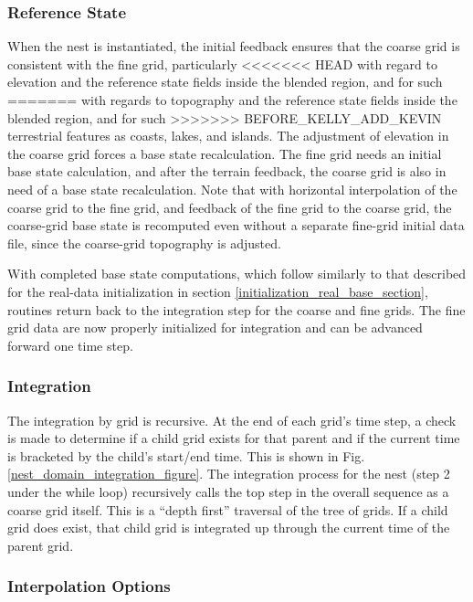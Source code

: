\subsubsection{Reference State}
When the nest is instantiated, the initial feedback ensures
that the coarse grid is consistent with the fine grid, particularly 
<<<<<<< HEAD
with regard to elevation and the reference state fields inside the blended region, and for such 
=======
with regards to topography and the reference state fields inside the blended region, and for such 
>>>>>>> BEFORE_KELLY_ADD_KEVIN
terrestrial features as coasts, lakes, and islands.  The adjustment 
of elevation in the coarse grid forces a base state recalculation.  
The fine grid needs an initial base state calculation, and after
the terrain feedback, the coarse grid is also in need of a base state
recalculation.  Note that with horizontal interpolation of the coarse grid 
to the fine grid, and feedback of the fine grid to the coarse 
grid, the coarse-grid base state is recomputed 
even without a separate fine-grid initial data file, 
since the coarse-grid topography is adjusted.

With completed base state computations, which follow similarly to
that described for the real-data initialization in section
\ref{initialization_real_base_section},
routines return 
back to the integration step for the coarse and fine grids.
The fine grid data are now properly initialized for integration and
can be advanced forward one time step.

\subsubsection{Integration}

The integration by grid is recursive.  At the end of each grid's time step, a check
is made to determine if a child grid exists for that parent and if the
current time is bracketed by the child's start/end time.  
This is shown in Fig. \ref{nest_domain_integration_figure}.  The integration process for the nest (step 2 under the
while loop) recursively calls the top step in the overall sequence as a coarse grid itself.
This is a ``depth first'' 
traversal of the tree of grids.
If a child grid does exist, that child grid is integrated up through the current time of 
the parent grid.

\subsubsection{Interpolation Options}

